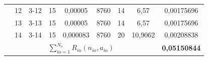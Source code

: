 \begin{table}
\begin{center}
\begin{tabular}{|c|c|c|c|c|c|c|c|c|}
&12\hphantom{9}&\hphantom{9}3-12&15&0,00005\hphantom{9}&8760&14&6,57\hphantom{99}&0,00175696\\


&13\hphantom{9}&\hphantom{9}3-13&15&0,00005\hphantom{9}&8760&14&6,57\hphantom{99}&0,00175696\\

&14\hphantom{9}&\hphantom{9}3-14&15&0,000083&8760&20&10,9062\hphantom{9}&0,00208838\\

\hline

\multicolumn{8}{|c|}{$\sum\limits_{i\mathrm{o}=1}^{N_{\mathrm{o}}}

R_{i\mathrm{o}} (n_{i\mathrm{o}},

a_{i\mathrm{o}})$}&\textbf{0,05150844}\\

\hline

\end{tabular}

\end{center}

\end{table}





